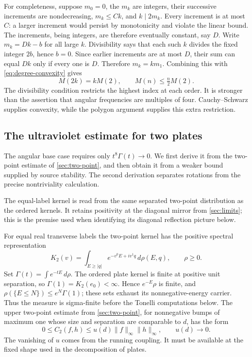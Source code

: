 \documentclass[11pt,letterpaper,reqno]{amsart}
\theoremstyle{definition}
\theoremstyle{remark}
\begin{document}
For completeness, suppose $m_0=0$, the $m_k$ are integers, their
successive increments are nondecreasing, $m_k\le Ck$, and
$k\mid2m_k$. Every increment is at most $C$: a larger increment
would persist by monotonicity and violate the linear bound. The
increments, being integers, are therefore eventually constant, say
$D$. Write $m_k=Dk-b$ for all large $k$. Divisibility says that each
such $k$ divides the fixed integer $2b$, hence $b=0$. Since earlier
increments are at most $D$, their sum can equal $Dk$ only if every
one is $D$. Therefore $m_k=km_1$. Combining this with
\eqref{eq:degree-convexity} gives
\begin{equation}\label{eq:degree-linearity}
 M(2k)=kM(2),\qquad M(n)\le\tfrac n2M(2).
\end{equation}
The divisibility condition restricts the highest index at each
order. It is stronger than the assertion that angular frequencies
are multiples of four. Cauchy--Schwarz supplies convexity, while
the polygon argument supplies this extra restriction.

\subsection{The ultraviolet estimate for two plates}

The angular base case requires only $t^8\Gamma(t)\to0$. We first
derive it from the two-point estimate of \cref{sec:two-point}, and
then obtain it from a weaker bound supplied by source stability. The
second derivation separates rotations from the precise nontriviality
calculation.

The equal-label kernel is read from the same separated
two-point distribution as the ordered kernels.
It retains positivity at the diagonal mirror
from \cref{sec:limits}; this is the premise used
when identifying its diagonal reflection picture below.

For equal real transverse labels the two-point kernel has the
positive spectral representation
\[
 K_2(v)=\int_{E\ge|q|}e^{-v^0E+iv^1q}\,d\rho(E,q),
 \qquad \rho\ge0.
\]
Set \(\Gamma(t)=\int e^{-tE}\,d\rho\).
The ordered plate kernel is finite at positive unit
separation, so \(\Gamma(1)=K_2(e_0)<\infty\).
Hence \(e^{-E}\rho\) is finite, and
\(\rho(\{E\le N\})\le e^N\Gamma(1)\);
these sets exhaust its nonnegative-energy carrier.
Thus the measure is sigma-finite before the
Tonelli computations below.
The upper two-point estimate
from \cref{sec:two-point}, for nonnegative bumps of maximum one
whose size and separation are comparable to $d$, has the form
\[
 0\le C_2(f,h)\le u(d)\|f\|_\infty\|h\|_\infty,
 \qquad u(d)\longrightarrow0.
\]
The vanishing of $u$ comes from the running coupling. It must be
available at the fixed shape used in the decomposition of plates.
\end{document}
